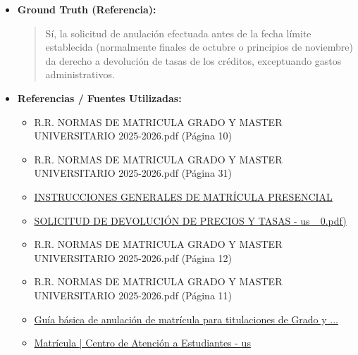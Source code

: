 \documentclass[12pt,a4paper,oneside]{report}
\begin{document}
\begin{itemize}
\begin{itemize}
\begin{quote}
Recuerda que la información proporcionada se basa en las normas y procedimientos generales de la Universidad de Sevilla y puede estar sujeta a cambios. Es fundamental verificar la información con fuentes oficiales de la universidad para asegurarte de que estás siguiendo el procedimiento correcto.
                \end{quote}
          \item \textbf{{Ground Truth (Referencia):}} \\
                \begin{quote}
Sí, la solicitud de anulación efectuada antes de la fecha límite establecida (normalmente finales de octubre o principios de noviembre) da derecho a devolución de tasas de los créditos, exceptuando gastos administrativos.
                \end{quote}
          \item \textbf{{Referencias / Fuentes Utilizadas:}} \\
                \begin{itemize}
                  \item R.R. NORMAS DE MATRICULA GRADO Y MASTER UNIVERSITARIO 2025-2026.pdf (Página 10)
                  \item R.R. NORMAS DE MATRICULA GRADO Y MASTER UNIVERSITARIO 2025-2026.pdf (Página 31)
                  \item \href{https://www.informatica.us.es/docs/secretaria/instrucciones-matricula-presencial.pdf}{INSTRUCCIONES GENERALES DE MATRÍCULA PRESENCIAL}
                  \item \href{https://medicina.us.es/sites/medicina/files/doc/SOLICITUD\_DE\_DEVOLUCION\_DE\_PRECIOS\_Y\_TASAS+NUEVO+(1}{SOLICITUD DE DEVOLUCIÓN DE PRECIOS Y TASAS - us \_0.pdf)}
                  \item R.R. NORMAS DE MATRICULA GRADO Y MASTER UNIVERSITARIO 2025-2026.pdf (Página 12)
                  \item R.R. NORMAS DE MATRICULA GRADO Y MASTER UNIVERSITARIO 2025-2026.pdf (Página 11)
                  \item \href{https://cat.us.es/index.php/matricula/guia-basica-de-anulacion-de-matricula-para-titulaciones-de-grado-y-master}{Guía básica de anulación de matrícula para titulaciones de Grado y ...}
                  \item \href{https://cat.us.es/matricula}{Matrícula | Centro de Atención a Estudiantes - us}
                \end{itemize}
        \end{itemize}


\end{itemize}
\end{document}
